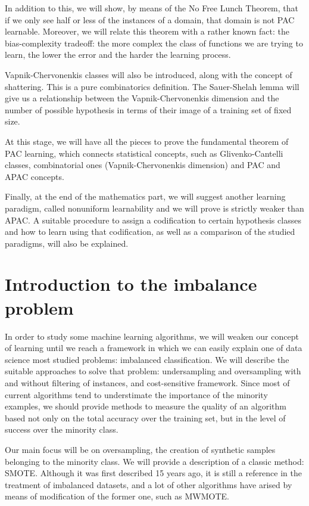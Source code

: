In addition to this, we will show, by means of the No Free Lunch Theorem, that if we only see half or less of the instances 
of a domain, that domain is not PAC learnable. Moreover, we will relate this theorem with a rather known fact: the 
bias-complexity tradeoff: the more complex the class of functions we are trying to learn, the lower the error and the
harder the learning process.

Vapnik-Chervonenkis classes will also be introduced, along with the concept of shattering. This is a pure combinatorics
definition. The Sauer-Shelah lemma will give us a relationship between the Vapnik-Chervonenkis dimension and the number
of possible hypothesis in terms of their image of a training set of fixed size. 

At this stage, we will have all the pieces to prove the fundamental theorem of PAC learning, which connects statistical
concepts, such as Glivenko-Cantelli classes, combinatorial ones (Vapnik-Chervonenkis dimension) and PAC and APAC
concepts.

Finally, at the end of the mathematics part, we will suggest another learning paradigm, called nonuniform learnability 
and we will prove is strictly weaker than APAC. A suitable procedure to assign a codification to certain hypothesis
classes and how to learn using that codification, as well as a comparison of the studied paradigms, will also
be explained.

\section*{Introduction to the imbalance problem}

In order to study some machine learning algorithms, we will weaken our concept of learning until we reach a framework in which
we can easily explain one of data science most studied problems: imbalanced classification. We will describe the suitable
approaches to solve that problem: undersampling and oversampling with and without filtering of instances, and cost-sensitive 
framework. Since most of current algorithms tend to understimate the importance of the minority examples, 
we should provide methods to measure the quality of an algorithm based not only on the total accuracy over the training
set, but in the level of success over the minority class.

Our main focus will be on oversampling, the creation of synthetic samples belonging to the minority class. We will provide
a description of a classic method: SMOTE. Although it was first described 15 years ago, it is still a reference in the
treatment of imbalanced datasets, and a lot of other algorithms have arised by means of modification of the former one, such as
MWMOTE.

